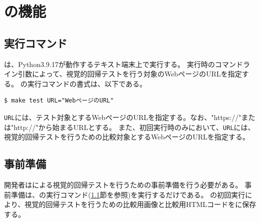 \section{\toolName の機能}
\subsection{実行コマンド}\label{subsec:MixVRT_execution}
\toolName は、Python3.9.17\cite{Python}が動作するテキスト端末上で実行する。
\toolName 実行時のコマンドライン引数によって、視覚的回帰テストを行う対象のWebページのURLを指定する。
\toolName の実行コマンドの書式は、以下である。
\begin{lstlisting}[label=list:command,frame=none,numbers=none,basicstyle={\normalsize \ttfamily \color[gray]{.15}}]
  $ make test URL="WebページのURL"
 \end{lstlisting}
{\tt URL}には、テスト対象とするWebページのURLを指定する。なお、"https://"または"http://"から始まるURLとする。
また、初回実行時のみにおいて、{\tt URL}には、視覚的回帰テストを行うための比較対象とするWebページのURLを指定する。

\subsection{事前準備}\label{subsec:MixVRT_preparation}
開発者は\toolName による視覚的回帰テストを行うための事前準備を行う必要がある。
事前準備は、\toolName の実行コマンド(\ref{subsec:MixVRT_execution}節を参照)を実行するだけである。
\toolName の初回実行により、視覚的回帰テストを行うための比較用画像と比較用HTMLコードを\toolName に保存する。


